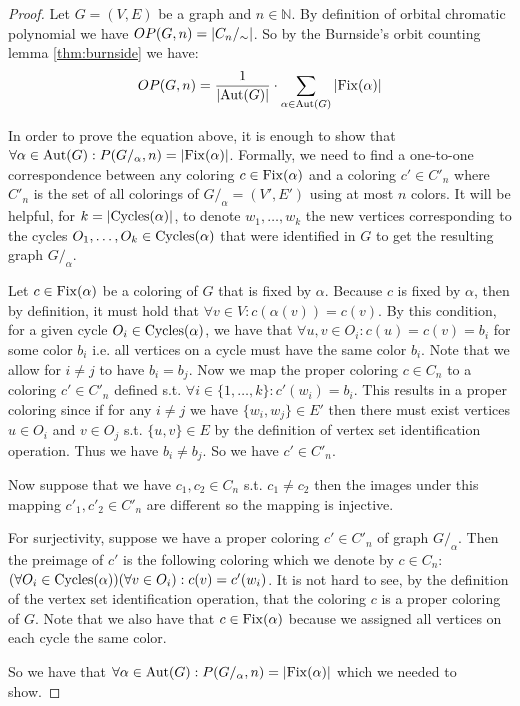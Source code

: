 \begin{proof}

    Let $G=(V,E)$ be a graph and $n \in \mathbb{N}$. By definition of orbital chromatic polynomial we have $OP(G,n) = \left|{C_n /_{\sim}}\right|$. So by the Burnside's orbit counting lemma \ref{thm:burnside} we have:
    $$OP(G,n) = \frac{1}{\left|{\operatorname{Aut}(G)}\right|} \cdot \sum_{\alpha \in \operatorname{Aut}(G)} \left|{\operatorname{Fix}(\alpha)}\right|$$

    In order to prove the equation above, it is enough to show that $\forall \alpha \in \operatorname{Aut}(G) : P(G/_{\alpha},n) = \left|{\operatorname{Fix}(\alpha)}\right|$. Formally, we need to find a one-to-one correspondence between any coloring $c \in \operatorname{Fix}(\alpha)$ and a coloring $c' \in C'_n$ where $C'_n$ is the set of all colorings of $G /_\alpha = (V',E')$ using at most $n$ colors. It will be helpful, for $k = \left|{\operatorname{Cycles}(\alpha)}\right|$, to denote $w_1, \ldots , w_k$ the new vertices corresponding to the cycles $O_1, \ldots ,O_k \in \operatorname{Cycles}(\alpha)$ that were identified in $G$ to get the resulting graph $G/_\alpha$.
    
    Let $c \in \operatorname{Fix}(\alpha)$ be a coloring of $G$ that is fixed by $\alpha$. Because $c$ is fixed by $\alpha$, then by definition, it must hold that $\forall v \in V : c(\alpha(v)) = c(v)$. By this condition, for a given cycle $O_i \in \operatorname{Cycles}(\alpha)$, we have that $\forall u,v \in O_i : c(u) = c(v) = b_i$ for some color $b_i$ i.e. all vertices on a cycle must have the same color $b_i$. Note that we allow for $i \neq j$ to have $b_i = b_j$. Now we map the proper coloring $c \in C_n$ to a coloring $c' \in C'_n$ defined s.t. $\forall i \in \{1, \ldots ,k\} : c'(w_i) = b_i$. This results in a proper coloring since if for any $i \neq j$ we have $\{w_i,w_j\} \in E'$ then there must exist vertices $u \in O_i$ and $v \in O_j$ s.t. $\{u,v\} \in E$ by the definition of vertex set identification operation. Thus we have $b_i \neq b_j$. So we have $c' \in C'_n$. 
    
    Now suppose that we have $c_1,c_2 \in C_n$ s.t. $c_1 \neq c_2$ then the images under this mapping $c'_1,c'_2 \in C'_n$ are different so the mapping is injective.

    For surjectivity, suppose we have a proper coloring $c' \in C'_n$ of graph $G/_\alpha$. Then the preimage of $c'$ is the following coloring which we denote by $c \in C_n$: $(\forall O_i \in \operatorname{Cycles}(\alpha))( \forall v \in O_i) : c(v) = c'(w_i)$. It is not hard to see, by the definition of the vertex set identification operation, that the coloring $c$ is a proper coloring of $G$. Note that we also have that $c \in \operatorname{Fix}(\alpha)$ because we assigned all vertices on each cycle the same color.

    So we have that $\forall \alpha \in \operatorname{Aut}(G) : P(G/_{\alpha},n) = \left|{\operatorname{Fix}(\alpha)}\right|$ which we needed to show. 
     
\end{proof}

